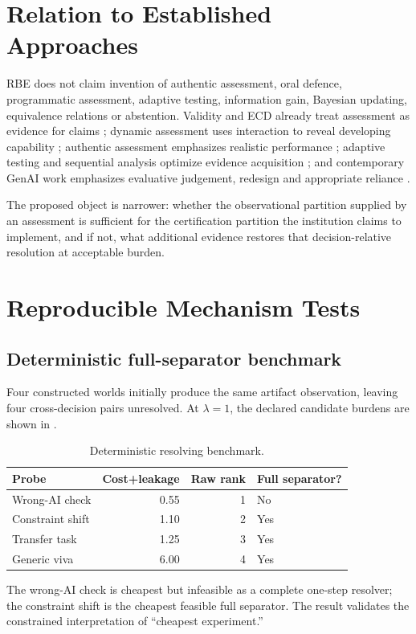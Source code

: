 \documentclass[11pt]{article}
\begin{document}
\section{Relation to Established Approaches}
RBE does not claim invention of authentic assessment, oral defence, programmatic assessment, adaptive testing, information gain, Bayesian updating, equivalence relations or abstention. Validity and ECD already treat assessment as evidence for claims \parencite{messick1995validity,mislevy2003ecd}; dynamic assessment uses interaction to reveal developing capability \parencite{allal2000zpd,poehner2011validity}; authentic assessment emphasizes realistic performance \parencite{gulikers2004authentic}; adaptive testing and sequential analysis optimize evidence acquisition \parencite{wald1947,vanderlinden2010}; and contemporary GenAI work emphasizes evaluative judgement, redesign and appropriate reliance \parencite{bearman2024evaluative,khlaif2025redesign,passi2024reliance}.

The proposed object is narrower: whether the observational partition supplied by an assessment is sufficient for the certification partition the institution claims to implement, and if not, what additional evidence restores that decision-relative resolution at acceptable burden.

\section{Reproducible Mechanism Tests}
\subsection{Deterministic full-separator benchmark}
Four constructed worlds initially produce the same artifact observation, leaving four cross-decision pairs unresolved. At $\lambda=1$, the declared candidate burdens are shown in .
\begin{table}[t]\centering\caption{Deterministic resolving benchmark.}\label{tab:det}
\begin{tabular}{lrrl}\toprule Probe & Cost+leakage & Raw rank & Full separator?\\\midrule
Wrong-AI check&0.55&1&No\\Constraint shift&1.10&2&Yes\\Transfer task&1.25&3&Yes\\Generic viva&6.00&4&Yes\\\bottomrule\end{tabular}\end{table}
The wrong-AI check is cheapest but infeasible as a complete one-step resolver; the constraint shift is the cheapest feasible full separator. The result validates the constrained interpretation of ``cheapest experiment.''
\end{document}
